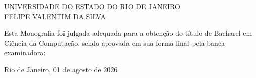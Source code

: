 \begin{folhadeaprovacao}
\begin{center}
            {UNIVERSIDADE DO ESTADO DO RIO DE JANEIRO} \\
    \vspace{1.5cm}
                                    {FELIPE VALENTIM DA SILVA}\\
    \bfseries{}
\end{center}

Esta Monografia foi julgada adequada para a obten\c{c}\~{a}o do título de Bacharel em Ciência da Computação, sendo aprovada em sua forma final pela banca examinadora:

    \vspace{2.5cm}
    \vspace{3 cm}

    \begin{center}
        Rio de Janeiro, 01 de agosto de 2026
    \end{center}
\end{folhadeaprovacao}
